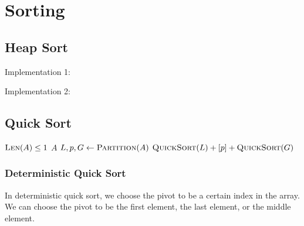 \chapter{Sorting}

\section{Heap Sort}

\begin{minipage}[t]{0.45\linewidth}
    Implementation 1:

\end{minipage}
\begin{minipage}[t]{0.45\linewidth}
    Implementation 2:

\end{minipage}

\section{Quick Sort}

\begin{algorithm}[H] \begin{algorithmic}[1]
        \If $\textsc{Len}(A) \le 1$ 
            \State \Return $A$
        \EndIf
        \State $L, p, G \gets \textsc{Partition}(A)$
        \State \Return $\textsc{QuickSort}(L) + [p] + \textsc{QuickSort}(G)$
    \EndProcedure
\end{algorithmic} \end{algorithm}

\subsection{Deterministic Quick Sort}

In deterministic quick sort, we choose the pivot to be a certain index in the array. We can choose the pivot to be the first element, the last element, or the middle element. 


